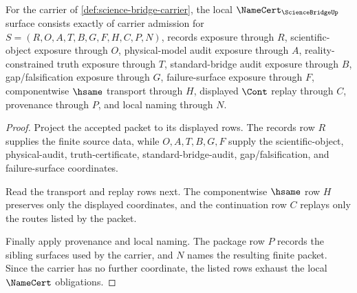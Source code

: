 \begin{theorem}
\label{thm:science-bridge-namecert-obligations}
For the carrier of \autoref{def:science-bridge-carrier}, the local $\NameCert_{\ScienceBridgeUp}$ surface consists exactly of carrier admission for $S=(R,O,A,T,B,G,F,H,C,P,N)$, records exposure through $R$, scientific-object exposure through $O$, physical-model audit exposure through $A$, reality-constrained truth exposure through $T$, standard-bridge audit exposure through $B$, gap/falsification exposure through $G$, failure-surface exposure through $F$, componentwise $\hsame$ transport through $H$, displayed $\Cont$ replay through $C$, provenance through $P$, and local naming through $N$.
\end{theorem}
\begin{proof}
Project the accepted packet to its displayed rows. The records row $R$ supplies the finite source data, while $O,A,T,B,G,F$ supply the scientific-object, physical-audit, truth-certificate, standard-bridge-audit, gap/falsification, and failure-surface coordinates.

Read the transport and replay rows next. The componentwise $\hsame$ row $H$ preserves only the displayed coordinates, and the continuation row $C$ replays only the routes listed by the packet.

Finally apply provenance and local naming. The package row $P$ records the sibling surfaces used by the carrier, and $N$ names the resulting finite packet. Since the carrier has no further coordinate, the listed rows exhaust the local $\NameCert$ obligations.
\end{proof}

